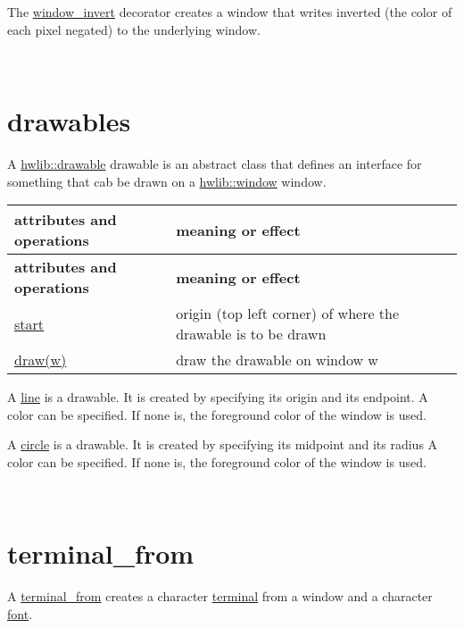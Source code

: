 The \hyperlink{classhwlib_1_1window__invert}{window\+\_\+invert} decorator creates a window that writes inverted (the color of each pixel negated) to the underlying window.

~\newline
 

\hypertarget{graphics_drawables}{}\section{drawables}\label{graphics_drawables}
A \hyperlink{classhwlib_1_1drawable}{hwlib\+::drawable} drawable is an abstract class that defines an interface for something that cab be drawn on a \hyperlink{classhwlib_1_1window}{hwlib\+::window} window.

\tabulinesep=1mm
\begin{longtabu} spread 0pt [c]{*{2}{|X[-1]}|}
\hline
\rowcolor{\tableheadbgcolor}\textbf{ attributes and operations }&\textbf{ meaning or effect  }\\
\endfirsthead
\hline
\endfoot
\hline
\rowcolor{\tableheadbgcolor}\textbf{ attributes and operations }&\textbf{ meaning or effect  }\\
\endhead
\hyperlink{classhwlib_1_1drawable_a6c31bc9303840a4317d3c95250c357ce}{start} &origin (top left corner) of where the drawable is to be drawn \\
\hyperlink{classhwlib_1_1drawable_ac9ea0de52a14d9024cb34110f794ac28}{draw(w)} &draw the drawable on window w \\
\end{longtabu}
A \hyperlink{classhwlib_1_1line}{line} is a drawable. It is created by specifying its origin and its endpoint. A color can be specified. If none is, the foreground color of the window is used.

A \hyperlink{classhwlib_1_1circle}{circle} is a drawable. It is created by specifying its midpoint and its radius A color can be specified. If none is, the foreground color of the window is used.

~\newline
 

\hypertarget{graphics_terminal_from}{}\section{terminal\+\_\+from}\label{graphics_terminal_from}
A \hyperlink{classhwlib_1_1terminal__from}{terminal\+\_\+from} creates a character \hyperlink{classhwlib_1_1terminal}{terminal} from a window and a character \hyperlink{classhwlib_1_1font}{font}.

~\newline
 